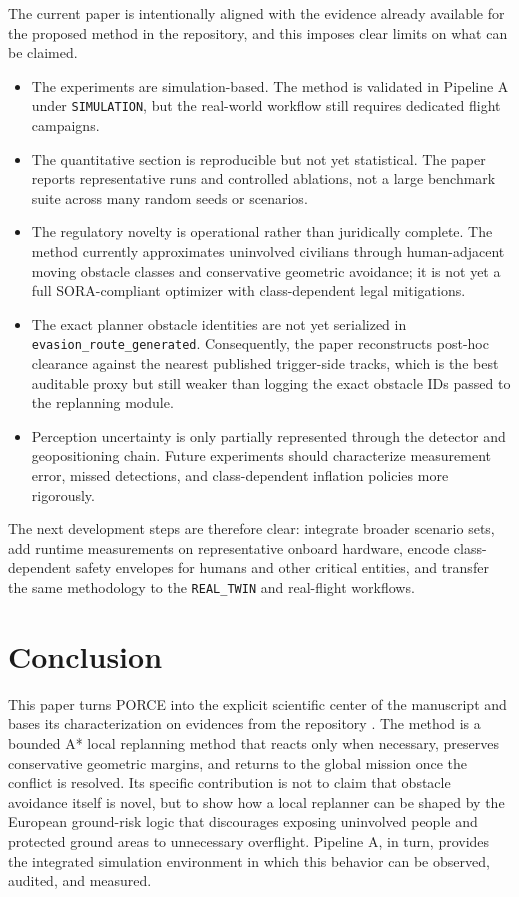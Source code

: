 \documentclass[journal,twoside,web]{ieeecolor}
\begin{document}
The current paper is intentionally aligned with the evidence already available for the proposed method in the repository, and this imposes clear limits on what can be claimed.
\begin{itemize}
    \item The experiments are simulation-based. The method is validated in Pipeline A under \texttt{SIMULATION}, but the real-world workflow still requires dedicated flight campaigns.
    \item The quantitative section is reproducible but not yet statistical. The paper reports representative runs and controlled ablations, not a large benchmark suite across many random seeds or scenarios.
    \item The regulatory novelty is operational rather than juridically complete. The method currently approximates uninvolved civilians through human-adjacent moving obstacle classes and conservative geometric avoidance; it is not yet a full SORA-compliant optimizer with class-dependent legal mitigations.
    \item The exact planner obstacle identities are not yet serialized in \texttt{evasion\_route\_generated}. Consequently, the paper reconstructs post-hoc clearance against the nearest published trigger-side tracks, which is the best auditable proxy but still weaker than logging the exact obstacle IDs passed to the replanning module.
    \item Perception uncertainty is only partially represented through the detector and geopositioning chain. Future experiments should characterize measurement error, missed detections, and class-dependent inflation policies more rigorously.
\end{itemize}

The next development steps are therefore clear: integrate broader scenario sets, add runtime measurements on representative onboard hardware, encode class-dependent safety envelopes for humans and other critical entities, and transfer the same methodology to the \texttt{REAL\_TWIN} and real-flight workflows.


\section{Conclusion}

This paper turns PORCE into the explicit scientific center of the manuscript and bases its characterization on evidences from the repository \cite{Deep_Aero_Twin}. The method is a bounded A* local replanning method that reacts only when necessary, preserves conservative geometric margins, and returns to the global mission once the conflict is resolved. Its specific contribution is not to claim that obstacle avoidance itself is novel, but to show how a local replanner can be shaped by the European ground-risk logic that discourages exposing uninvolved people and protected ground areas to unnecessary overflight. Pipeline A, in turn, provides the integrated simulation environment in which this behavior can be observed, audited, and measured.
\end{document}
